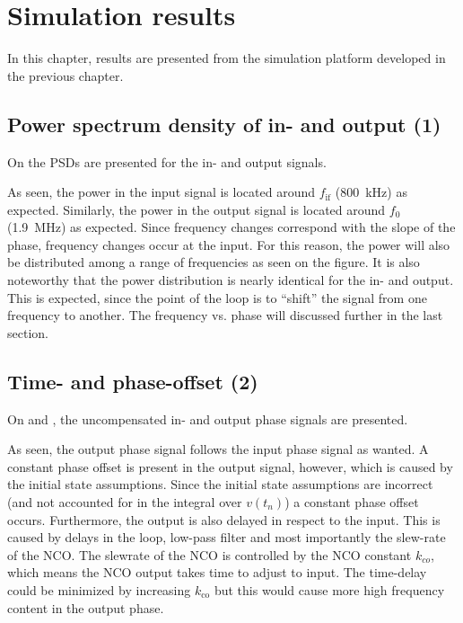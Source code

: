 \chapter{Simulation results} \label{ch:intro}
In this chapter, results are presented from the simulation platform developed in the previous chapter.
 
\section{Power spectrum density of in- and output (1)}
On  the PSDs are presented for the in- and output signals.


As seen, the power in the input signal is located around $f_{\text{if}}$ (\SI{800}{\kilo\hertz}) as expected. Similarly, the power in the output signal is located around $f_0$ (\SI{1.9}{\mega\hertz}) as expected. Since frequency changes correspond with the slope of the phase, frequency changes occur at the input. For this reason, the power will also be distributed among a range of frequencies as seen on the figure. It is also noteworthy that the power distribution is nearly identical for the in- and output. This is expected, since the point of the loop is to ``shift'' the signal from one frequency to another. The frequency vs. phase will discussed further in the last section.

\section{Time- and phase-offset (2)}
On  and , the uncompensated in- and output phase signals are presented.


As seen, the output phase signal follows the input phase signal as wanted. A constant phase offset is present in the output signal, however, which is caused by the initial state assumptions. Since the initial state assumptions are incorrect (and not accounted for in the integral over $v(t_n)$) a constant phase offset occurs. Furthermore, the output is also delayed in respect to the input. This is caused by delays in the loop, low-pass filter and most importantly the slew-rate of the NCO. The slewrate of the NCO is controlled by the NCO constant $k_{co}$, which means the NCO output takes time to adjust to input. The time-delay could be minimized by increasing $k_{\text{co}}$ but this would cause more high frequency content in the output phase.

